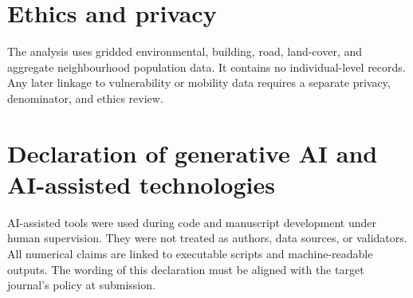 \section*{Ethics and privacy}

The analysis uses gridded environmental, building, road, land-cover,
and aggregate neighbourhood population data. It contains no individual-level
records. Any later linkage to vulnerability or mobility data requires a separate
privacy, denominator, and ethics review.

\section*{Declaration of generative AI and AI-assisted technologies}

AI-assisted tools were used during code and manuscript development under human
supervision. They were not treated as authors, data sources, or validators.
All numerical claims are linked to executable scripts and
machine-readable outputs. The wording of this declaration must be aligned with
the target journal's policy at submission.
